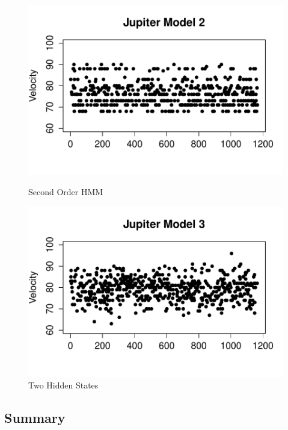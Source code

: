 \documentclass{article} %
\begin{document}
\begin{figure}[ht]
\begin{minipage}[b]{0.5\linewidth}
    \includegraphics[scale = 0.45]{JupiterModel2Velocity.pdf} 
    \caption{Second Order HMM\label{JV2}} 
    \vspace{4ex}
  \end{minipage}%
  \begin{minipage}[b]{0.5\linewidth}
    \centering
    \includegraphics[scale = 0.45]{JupiterModel3Velocity.pdf} 
    \caption{Two Hidden States\label{JV3}} 
    \vspace{4ex}
  \end{minipage} 
\end{figure}

\subsection{Summary}
\end{document}
